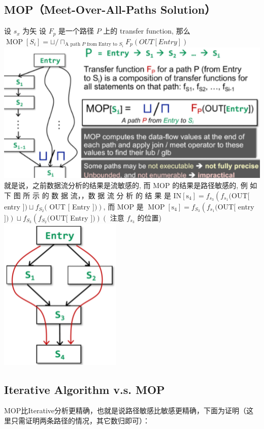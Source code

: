 \documentclass[a4paper]{article}
\theoremstyle{definition}
\begin{document}
\subsection{MOP（Meet-Over-All-Paths Solution）}
设 $s_{x}$ 为矢 设 $F_{p}$ 是一个路径 $P$ 上的 transfer function, 那么 $\operatorname{MOP}\left[S_{i}\right]=\sqcup / \sqcap_{\mathrm{A} \text { path } P \text { from Entry to } S_{i}} F_{p}(O U T[E n t r y])$
\\
\includegraphics{img/Snipaste_2021-06-04_16-43-45.png}\\
就是说，之前数据流分析的结果是流敏感的, 而 MOP 的结果是路径敏感的,
例 如 下 图 所 示 的 数 据 流，，数 据 流 分 析 的 结 果 是
$\mathrm{IN}\left[\mathrm{s}_{4}\right]=f_{s_{3}}\left(f_{s_{1}}(\mathrm{OUT}[\right.$ entry $]) \sqcup f_{S_{2}}($ OUT $[$ Entry $\left.])\right)$, 而 MOP 是
$\operatorname{MOP}\left[\mathrm{s}_{4}\right]=f_{S_{3}}\left(f_{s_{1}}(\mathrm{OUT}[\right.$ entry $\left.])\right) \sqcup f_{S_{3}}\left(f_{S_{2}}(\mathrm{OUT}[\right.$ Entry $\left.])\right)\left(\right.$ 注意 $f_{s_{3}}$
的位置)\\
\includegraphics{img/Snipaste_2021-06-04_16-44-21.png}
\subsection{Iterative Algorithm v.s. MOP}
MOP比Iterative分析更精确，也就是说路径敏感比敏感更精确，下面为证明（这里只需证明两条路径的情况，其它数归即可）：
\end{document}
